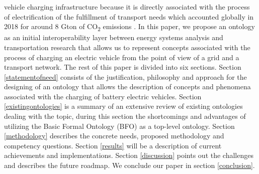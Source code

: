 vehicle charging infrastructure because it is directly associated with the
process of electrification of the fulfillment of transport needs which accounted
globally in 2018 for around 8 Gton of CO\textsubscript{2} emissions
\cite{IEA.2023}. In this paper, we propose an ontology as an initial
interoperability layer between energy systems analysis and transportation
research that allows us to represent concepts associated with the process of
charging an electric vehicle from the point of view of a grid and a transport
network. The rest of this paper is divided into six sections. Section
\ref{statementofneed} consists of the justification, philosophy and approach for
the designing of an ontology that allows the description of concepts and
phenomena associated with the charging of battery electric vehicles. Section
\ref{existingontologies} is a summary of an extensive review of existing
ontologies dealing with the topic, during this section the shortcomings and
advantages of utilizing the Basic Formal Ontology (BFO) \cite{Arp.2015} as a
top-level ontology. Section \ref{methodology} describes the concrete needs,
proposed methodology and competency questions. Section \ref{results} will be a
description of current achievements and implementations. Section
\ref{discussion} points out the challenges and describes the future roadmap. We
conclude our paper in section \ref{conclusion}.

